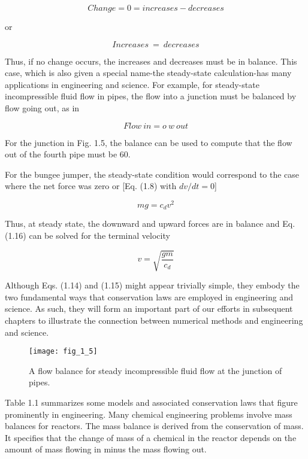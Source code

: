 \documentclass[../main.tex]{subfiles}
\begin{document}
$$ Change =  0  =  increases  −  decreases $$

or

\begin{equation}
	\tag{1.15}
	Increases \ = \ decreases
\end{equation}

Thus, if no change occurs, the increases and decreases must be in balance. This case, which
is also given a special name-the steady-state calculation-has many applications in engineering and science. For example, for steady-state incompressible fluid flow in pipes, the
flow into a junction must be balanced by flow going out, as in

\begin{equation}
	Flow \ in = o \ w \ out
\end{equation}

For the junction in Fig. 1.5, the balance can be used to compute that the flow out of the
fourth pipe must be 60.

For the bungee jumper, the steady-state condition would correspond to the case where
the net force was zero or [Eq. (1.8) with $dv/dt = 0$]

\begin{equation}
	mg =c_dv^2
\end{equation}

Thus, at steady state, the downward and upward forces are in balance and Eq. (1.16) can be
solved for the terminal velocity


$$v=\sqrt{\dfrac{gm}{c_d}}  $$

Although Eqs. (1.14) and (1.15) might appear trivially simple, they embody the two fundamental ways that conservation laws are employed in engineering and science. As such, they
will form an important part of our efforts in subsequent chapters to illustrate the connection
between numerical methods and engineering and science.


\begin{figure}[H]
	\centering
	\texttt{[image: fig\_1\_5]}
   \caption{\textsf{A flow balance for steady incompressible fluid flow at the junction of pipes.}}
   \label{fig_1_5}
\end{figure}

Table 1.1 summarizes some models and associated conservation laws that figure prominently in engineering. Many chemical engineering problems involve mass balances for
reactors. The mass balance is derived from the conservation of mass. It specifies that the
change of mass of a chemical in the reactor depends on the amount of mass flowing in
minus the mass flowing out.
\end{document}
